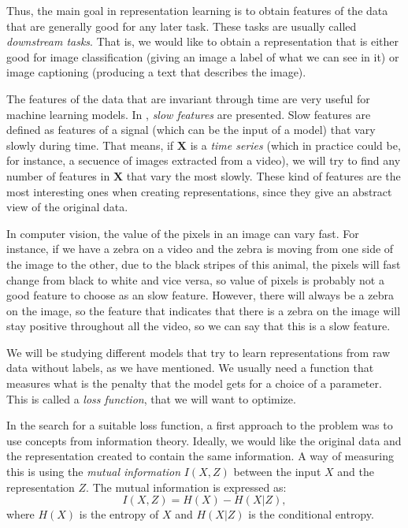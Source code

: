 Thus, the main goal in representation learning is to obtain features of the data that are generally good for any later task. These tasks are usually called \emph{downstream tasks}. That is, we would like to obtain
a representation that is either good for image classification (giving an image a label of what we can see in it) or image captioning (producing a text that describes the image).

The features of the data that are invariant through time are very useful for machine learning models. In \citep{wiskott_slow_2002}, \emph{slow features} are presented. Slow features are defined as features of a signal 
(which can be the input of a model) that vary slowly during time. That means, if $\bm{X}$ is a \emph{time series} (which in practice could be, for instance, a secuence of images extracted from a video), we will try to find any number of features in $\bm{X}$ that vary the most slowly.
These kind of features are the most interesting ones when creating representations, since they give an abstract view of the original data.


\begin{nexample} In computer vision, the value of the pixels in an image can vary fast. For instance, if we have a zebra on a video and the zebra is moving from one side of the image to the other, due 
to the black stripes of this animal, the pixels will fast change from black to white and vice versa, so value of pixels is probably not a good feature to choose as an slow feature. However, there will always
be a zebra on the image, so the feature that indicates that there is a zebra on the image will stay positive throughout all the video, so we can say that this is a slow feature.
\end{nexample}

We will be studying different models that try to learn representations from raw data without labels, as we have mentioned. We usually need a function that measures what is the penalty that the model gets for a choice of a parameter.
This is called a \emph{loss function}, that we will want to optimize. 



In the search for a suitable loss function, a first approach to the problem was to use concepts from information theory. Ideally, we would like the original data and the representation created to contain the same information. A way of measuring this is using the \emph{mutual information} $I(X,Z)$ between the input $X$ and the representation $Z$. The mutual information is expressed as:
\[
I(X,Z) = H(X) - H(X|Z),
\]
where $H(X)$ is the entropy of $X$ and $H(X|Z)$ is the conditional entropy.


